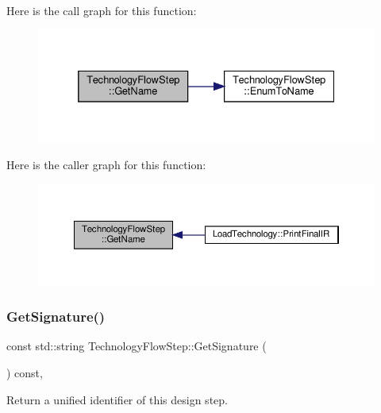 Here is the call graph for this function\+:
\nopagebreak
\begin{figure}[H]
\begin{center}
\leavevmode
\includegraphics[width=332pt]{d9/deb/classTechnologyFlowStep_ac50a4cc6222e4872c65c93f55415c3b7_cgraph}
\end{center}
\end{figure}
Here is the caller graph for this function\+:
\nopagebreak
\begin{figure}[H]
\begin{center}
\leavevmode
\includegraphics[width=350pt]{d9/deb/classTechnologyFlowStep_ac50a4cc6222e4872c65c93f55415c3b7_icgraph}
\end{center}
\end{figure}
\mbox{\label{classTechnologyFlowStep_a56b1c17014e131852e07a52bceee38e0}} 
\subsubsection{\texorpdfstring{Get\+Signature()}{GetSignature()}}
{\footnotesize\ttfamily const std\+::string Technology\+Flow\+Step\+::\+Get\+Signature (\begin{DoxyParamCaption}{ }\end{DoxyParamCaption}) const\hspace{0.3cm}{\ttfamily [override]}, {\ttfamily [virtual]}}



Return a unified identifier of this design step. 

